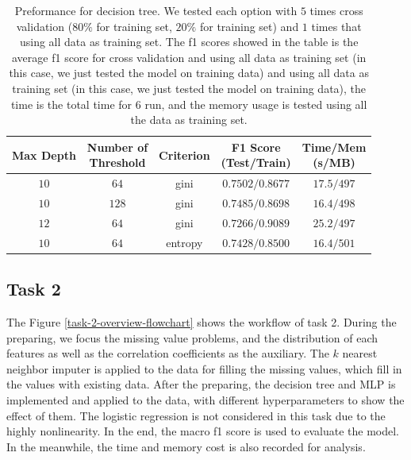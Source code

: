 \documentclass[11pt]{article}
\begin{document}
\begin{table}[H]
  \centering
  \begin{tabular}{|c|c|c|c|c|}
    \hline
    Max Depth & \makecell{Number of                                          \\ Threshold} & Criterion & \makecell{F1 Score \\ (Test/Train)} & \makecell{Time/Mem \\ (s/MB)}               \\
    \hline
    $10$      & $64$                & gini    & $0.7502/0.8677$ & $17.5/497$ \\
    \hline
    $10$      & $128$               & gini    & $0.7485/0.8698$ & $16.4/498$ \\
    \hline
    $12$      & $64$                & gini    & $0.7266/0.9089$ & $25.2/497$ \\
    \hline
    $10$      & $64$                & entropy & $0.7428/0.8500$ & $16.4/501$ \\
    \hline
  \end{tabular}
  \caption{Preformance for decision tree. We tested each option with $5$ times cross validation ($80\%$ for training set, $20\%$ for training set) and $1$ times that using all data as training set. The f1 scores showed in the table is the average f1 score for cross validation and using all data as training set (in this case, we just tested the model on training data) and using all data as training set (in this case, we just tested the model on training data), the time is the total time for $6$ run, and the memory usage is tested using all the data as training set.}
\end{table}

\subsection{Task 2}

The Figure \ref{task-2-overview-flowchart} shows the workflow of task 2. During the preparing, we focus the missing  value problems, and the distribution of each features as well as the correlation coefficients as the auxiliary. The $k$ nearest neighbor imputer is applied to the data for filling the missing values, which fill in the values with existing data. After the preparing, the decision tree and MLP is implemented and applied to the data, with different hyperparameters to show the effect of them. The logistic regression is not considered in this task due to the highly nonlinearity. In the end, the macro f1 score is used to evaluate the model. In the meanwhile, the time and memory cost is also recorded for analysis.
\end{document}
